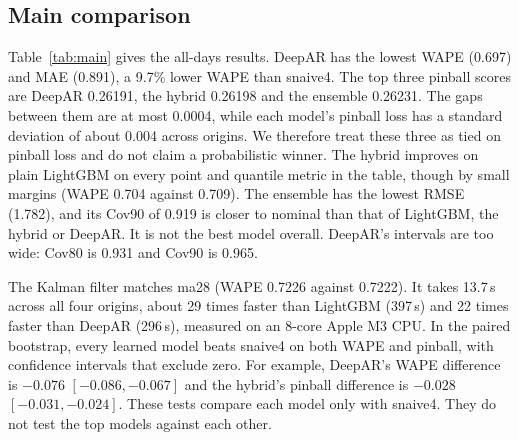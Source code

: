 \documentclass[conference]{IEEEtran}
\begin{document}
\subsection{Main comparison}
Table~\ref{tab:main} gives the all-days results. DeepAR has the lowest WAPE (0.697) and MAE (0.891), a 9.7\% lower WAPE than \textsf{snaive4}. The top three pinball scores are DeepAR 0.26191, the hybrid 0.26198 and the ensemble 0.26231. The gaps between them are at most 0.0004, while each model's pinball loss has a standard deviation of about 0.004 across origins. We therefore treat these three as tied on pinball loss and do not claim a probabilistic winner. The hybrid improves on plain LightGBM on every point and quantile metric in the table, though by small margins (WAPE 0.704 against 0.709). The ensemble has the lowest RMSE (1.782), and its Cov90 of 0.919 is closer to nominal than that of LightGBM, the hybrid or DeepAR. It is not the best model overall. DeepAR's intervals are too wide: Cov80 is 0.931 and Cov90 is 0.965.

The Kalman filter matches \textsf{ma28} (WAPE 0.7226 against 0.7222). It takes 13.7\,s across all four origins, about 29 times faster than LightGBM (397\,s) and 22 times faster than DeepAR (296\,s), measured on an 8-core Apple M3 CPU. In the paired bootstrap, every learned model beats \textsf{snaive4} on both WAPE and pinball, with confidence intervals that exclude zero. For example, DeepAR's WAPE difference is $-0.076$ $[-0.086,-0.067]$ and the hybrid's pinball difference is $-0.028$ $[-0.031,-0.024]$. These tests compare each model only with \textsf{snaive4}. They do not test the top models against each other.
\end{document}
